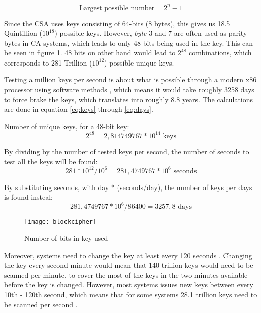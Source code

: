\begin{equation} 
  \text{Largest possible number} = 2^{n} - 1
  \label{eq:num}
\end{equation}

Since the CSA uses keys consisting of 64-bits (8 bytes), this gives us 
18.5 Quintillion ($10^{18}$) possible keys. However, \emph{byte} 3 and 
7 are often used as parity bytes in CA systems, which leads to only 48 
bits being used in the key.  This can be seen in figure 
\ref{fig:blockcipher}. 48 bits on other hand would lead to $2^{48}$ 
combinations, which corresponds to 281 Trillion ($10^{12}$) possible 
unique keys. 

Testing a million keys per second is about what is possible through a 
modern x86 processor using software methods 
, which means it would take 
roughly 3258 days to force brake the keys, which translates into 
roughly 8.8 years. The calculations are done in equation \ref{eq:keys} 
through \ref{eq:days}. \citep{Breaking:2012}

Number of unique keys, for a 48-bit key:
\begin{equation}
  2^{48} = 2,814749767*10^{14} \text{ keys}
  \label{eq:keys}
\end{equation}

By dividing by the number of tested keys per second, the number of 
seconds to test all the keys will be found:
\begin{equation}
  281*10^{12} / 10^{6} = 281,4749767*10^{6} \text{ seconds}
  \label{eq:seconds}
\end{equation}

By substituting seconds, with day * (seconds/day), the number of keys 
per days is found insteal:
\begin{equation}
  281,4749767*10^{6} / 86400 = 3257,8 \text{ days}
  \label{eq:days}
\end{equation}

\begin{figure}[h!]
  \begin{center}
    \texttt{[image: blockcipher]}
  \end{center}
  \caption{Number of bits in key used}
  \label{fig:blockcipher}
\end{figure}

Moreover, systems need to change the key at least every 120 seconds 
\citep{Simpson:2009}. Changing the key every second minute would mean 
that 140 trillion keys would need to be scanned per minute, to cover 
the most of the keys in the two minutes available before the key is 
changed. However, most systems issues new keys between every 10th - 
120th second, which means that for some systems 28.1 trillion keys need 
to be scanned per second \citep{Wirt:2004}.


